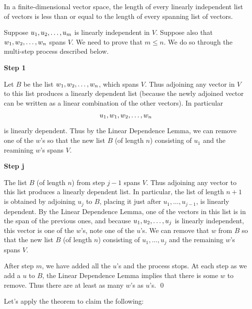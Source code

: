 \begin{theorem}
    In a finite-dimensional vector space, the length of every linearly independent list 
    of vectors is less than or equal to the length of every spanning list of vectors.

    \begin{proof*}
        Suppose $u_1, u_2, \ldots, u_{m}$ is linearly independent in $V$.
        Suppose also that $w_1, w_2, \ldots, w_{n}$ spans $V$. We need to prove that
        $m \leq n$. We do so through the multi-step process described below.

        \textbf{Step 1}

        Let $B$ be the list $w_1, w_2, \ldots, w_{n}$, which spans $V$. Thus adjoining any
        vector in $V$ to this list produces a linearly dependent list (because the newly
        adjoined vector can be written as a linear combination of the other vectors). In particular
        
        \[ u_1, w_1, w_2, \ldots, w_{n} \]

        is linearly dependent. Thus by the Linear Dependence Lemma,
        we can remove one of the $w$'s so that the new list $B$ (of length $n$)
        consisting of $u_1$ and the reamining $w$'s spans $V$.

        \textbf{Step j}

        The list $B$ (of length $n$) from step $j -1$ spans $V$. Thus adjoining any
        vector to this list produces a linearly dependent list. In particular, the
        list of length $n + 1$ is obtained by adjoining $u_j$ to $B$, placing it just after
        $u_1, \dots, u_{j-1}$, is linearly dependent. By the Linear Dependence Lemma, 
        one of the vectors in this list is in the span of the previous ones, and because
        $u_1, u_2, \ldots, u_{j}$ is linearly independent, this vector is one of the $w$'s, note one of
        the $u$'s. We can remove that $w$ from $B$ so that the new list $B$ (of length $n$)
        consisting of $u_1, \ldots, u_j$ and the remaining $w$'s spans $V$.
    
    After step $m$, we have added all the $u$'s and the process stops. At each step as
    we add a $u$ to $B$, the Linear Dependence Lemma implies that there is some $w$ to remove.
    Thus there are at least as many $w$'s as $u$'s. \qed
    \end{proof*}
\end{theorem}

Let's apply the theorem to claim the following:

